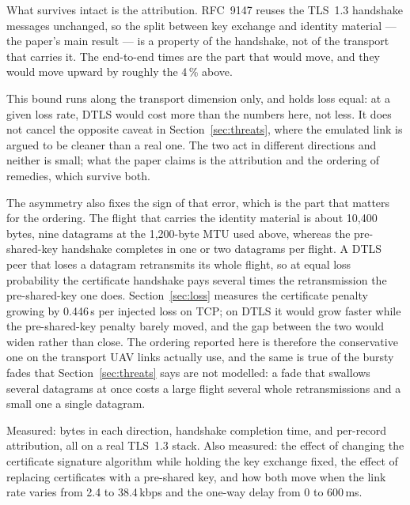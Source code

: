 \documentclass[drones,article,submit,pdftex,moreauthors]{Definitions/mdpi}
\newcommand{\kbps}{kbps}
\newcommand{\tls}{TLS}
\begin{document}
What survives intact is the attribution. RFC~9147 reuses the \tls{}~1.3
handshake messages unchanged, so the split between key exchange and
identity material --- the paper's main result --- is a property of the
handshake, not of the transport that carries it. The end-to-end times
are the part that would move, and they would move upward by roughly the
4\,\% above.

This bound runs along the transport dimension only, and holds loss
equal: at a given loss rate, DTLS would cost more than the numbers here,
not less. It does not cancel the opposite caveat in
Section~\ref{sec:threats}, where the emulated link is argued to be
cleaner than a real one. The two act in different directions and neither
is small; what the paper claims is the attribution and the ordering of
remedies, which survive both.

The asymmetry also fixes the sign of that error, which is the part that
matters for the ordering. The flight that carries the identity material
is about 10{,}400 bytes, nine datagrams at the 1{,}200-byte MTU used
above, whereas the pre-shared-key handshake completes in one or two
datagrams per flight. A DTLS peer that loses a datagram retransmits its
whole flight, so at equal loss probability the certificate handshake
pays several times the retransmission the pre-shared-key one does.
Section~\ref{sec:loss} measures the certificate penalty growing by
0.446\,s per injected loss on TCP; on DTLS it would grow faster while
the pre-shared-key penalty barely moved, and the gap between the two
would widen rather than close. The ordering reported here is therefore
the conservative one on the transport UAV links actually use, and the
same is true of the bursty fades that Section~\ref{sec:threats} says are
not modelled: a fade that swallows several datagrams at once costs a
large flight several whole retransmissions and a small one a single
datagram.

Measured: bytes in each direction, handshake completion time, and
per-record attribution, all on a real \tls{}~1.3 stack. Also measured:
the effect of changing the certificate signature algorithm while
holding the key exchange fixed, the effect of replacing certificates
with a pre-shared key, and how both move when the link rate varies from
2.4 to 38.4\,\kbps{} and the one-way delay from 0 to 600\,ms.
\end{document}
